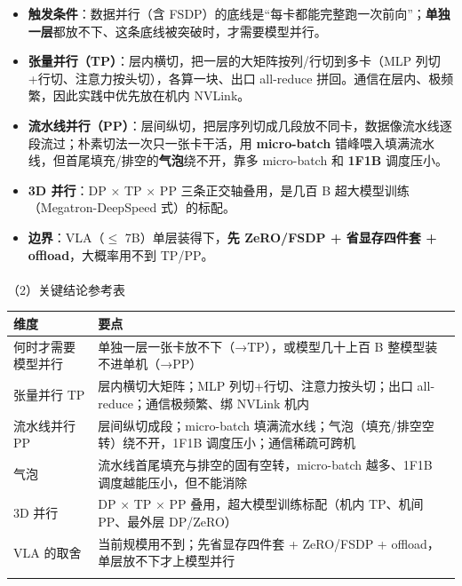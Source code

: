 \documentclass[
  chinese,
]{ctexart}
\makeatletter
\let\oldparagraph\paragraph
\renewcommand{\paragraph}{
    \@ifstar
      \xxxParagraphStar
      \xxxParagraphNoStar
  }
\newcommand{\xxxParagraphStar}[1]{\oldparagraph*{#1}\mbox{}}
\newcommand{\xxxParagraphNoStar}[1]{\oldparagraph{#1}\mbox{}}
\providecommand{\tightlist}{%
  \setlength{\itemsep}{0pt}\setlength{\parskip}{0pt}}
\makeatother
\begin{document}
\begin{itemize}
\tightlist
\item
  \textbf{触发条件}：数据并行（含
  FSDP）的底线是``每卡都能完整跑一次前向''；\textbf{单独一层}都放不下、这条底线被突破时，才需要模型并行。
\item
  \textbf{张量并行（TP）}：层内横切，把一层的大矩阵按列/行切到多卡（MLP
  列切+行切、注意力按头切），各算一块、出口 all-reduce
  拼回。通信在层内、极频繁，因此实践中优先放在机内 NVLink。
\item
  \textbf{流水线并行（PP）}：层间纵切，把层序列切成几段放不同卡，数据像流水线逐段流过；朴素切法一次只一张卡干活，用
  \textbf{micro-batch}
  错峰喂入填满流水线，但首尾填充/排空的\textbf{气泡}绕不开，靠多
  micro-batch 和 \textbf{1F1B} 调度压小。
\item
  \textbf{3D 并行}：DP × TP × PP 三条正交轴叠用，是几百 B
  超大模型训练（Megatron-DeepSpeed 式）的标配。
\item
  \textbf{边界}：VLA（\(\le\) 7B）单层装得下，\textbf{先 ZeRO/FSDP +
  省显存四件套 + offload}，大概率用不到 TP/PP。
\end{itemize}

\paragraph{（2）关键结论参考表}\label{ux5173ux952eux7ed3ux8bbaux53c2ux8003ux8868-3}

\begin{center}
\begin{tabular}{@{}>{\raggedright\arraybackslash}p{} >{\raggedright\arraybackslash}p{}@{}}
\toprule\noalign{}
维度 & 要点 \\
\midrule\noalign{}
何时才需要模型并行 & 单独一层一张卡放不下（→TP），或模型几十上百 B 整模型装不进单机（→PP） \\
张量并行 TP & 层内横切大矩阵；MLP 列切+行切、注意力按头切；出口 all-reduce；通信极频繁、绑 NVLink 机内 \\
流水线并行 PP & 层间纵切成段；micro-batch 填满流水线；气泡（填充/排空空转）绕不开，1F1B 调度压小；通信稀疏可跨机 \\
气泡 & 流水线首尾填充与排空的固有空转，micro-batch 越多、1F1B 调度越能压小，但不能消除 \\
3D 并行 & DP × TP × PP 叠用，超大模型训练标配（机内 TP、机间 PP、最外层 DP/ZeRO） \\
VLA 的取舍 & 当前规模用不到；先省显存四件套 + ZeRO/FSDP + offload，单层放不下才上模型并行 \\
\bottomrule\noalign{}
\end{tabular}
\end{center}
\end{document}

